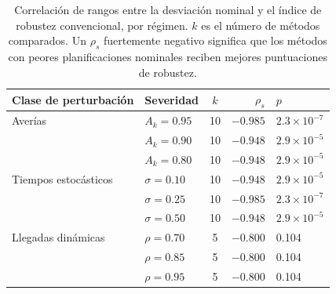 \begin{table}[t]
\caption{Correlación de rangos entre la desviación nominal y el índice de robustez convencional, por régimen. $k$ es el número de métodos comparados. Un $\rho_s$ fuertemente negativo significa que los métodos con peores planificaciones nominales reciben mejores puntuaciones de robustez.}\label{tbl:artifact}
\begin{tabular*}{\tblwidth}{@{}LLcrl@{}}
\toprule
Clase de perturbación & Severidad & $k$ & $\rho_s$ & $p$ \\
\midrule
Averías & $A_k=0.95$ & 10 & $-0.985$ & $2.3\times10^{-7}$ \\
 & $A_k=0.90$ & 10 & $-0.948$ & $2.9\times10^{-5}$ \\
 & $A_k=0.80$ & 10 & $-0.948$ & $2.9\times10^{-5}$ \\
Tiempos estocásticos & $\sigma=0.10$ & 10 & $-0.948$ & $2.9\times10^{-5}$ \\
 & $\sigma=0.25$ & 10 & $-0.985$ & $2.3\times10^{-7}$ \\
 & $\sigma=0.50$ & 10 & $-0.948$ & $2.9\times10^{-5}$ \\
Llegadas dinámicas & $\rho=0.70$ & 5 & $-0.800$ & 0.104 \\
 & $\rho=0.85$ & 5 & $-0.800$ & 0.104 \\
 & $\rho=0.95$ & 5 & $-0.800$ & 0.104 \\
\bottomrule
\end{tabular*}
\end{table}

